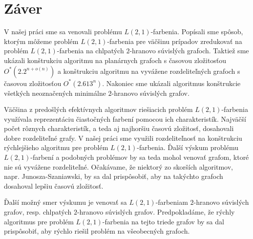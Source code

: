 \chapter*{Záver}  %

V našej práci sme sa venovali problému $L(2,1)$-farbenia. Popísali sme spôsob, ktorým
môžeme problém $L(2,1)$-farbenia pre väčšinu prípadov zredukovať na problém $L(2,1)$-farbenia
na chlpatých $2$-hranovo súvislých grafoch. Taktiež sme ukázali konštrukciu
algoritmu na planárnych grafoch s časovou zložitosťou $O^*(2.2^{n + o(n)})$
a konštrukciu algoritmu na vyvážene rozdeliteľných grafoch s časovou zložitosťou
$O^*(2.613^n)$. Nakoniec sme ukázali algoritmus konštrukcie všetkých neoznačených
minimálne $2$-hranovo súvislých grafov.

Väčšina z predošlých efektívnych algoritmov riešiacich problém $L(2,1)$-farbenia
využívala reprezentáciu čiastočných farbení pomocou ich charakteristík. Najväčší
počet rôznych charakteristík, a teda aj najhoršiu časovú zložitosť, dosahovali
dobre rozdeliteľné grafy. V našej práci sme využili rozdeliteľnosť na konštrukciu
rýchlejšieho algoritmu pre problém $L(2,1)$-farbenia. Ďalší výskum problému
$L(2,1)$-farbení a podobných problémov by sa teda mohol venovať grafom, ktoré
nie sú vyvážene rozdeliteľné. Očakávame, že niektorý zo skorších
algoritmov, napr. Junosza-Szaniawski, by sa dal prispôsobiť, aby na takýchto
grafoch dosahoval lepšiu časovú zložitosť.

Ďalší možný smer výskumu je venovať sa $L(2,1)$-farbeniam $2$-hranovo
súvislých grafov, resp. chlpatých $2$-hranovo súvislých grafov. Predpokladáme,
že rýchly algoritmus pre problém $L(2,1)$-farbenia na tejto triede grafov
by sa dal prispôsobiť, aby rýchlo riešil problém na všeobecných grafoch.
